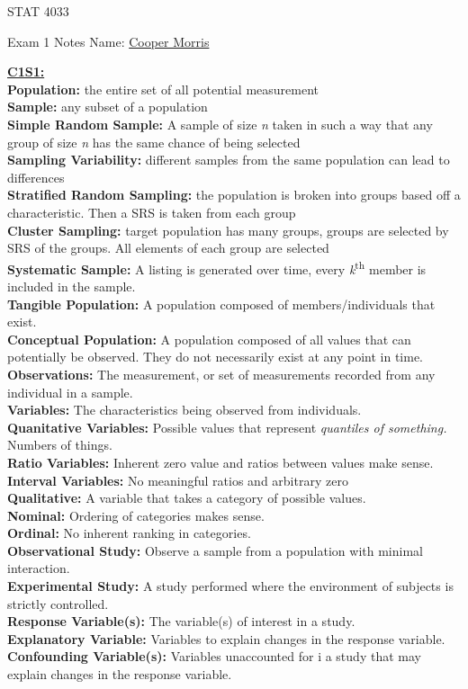 \documentclass[letter, 12pt]{article}
\begin{document}
\begin{center}
STAT 4033
\end{center}
Exam 1 Notes \hfill Name: \uline{Cooper Morris}
\begin{multicols}{2}
\textbf{\uline{C1S1:}}\\
\textbf{Population:} the entire set of all potential measurement\\
\textbf{Sample:} any subset of a population\\
\textbf{Simple Random Sample:} A sample of size \textit{n} taken in such a way that any group of size \textit{n} has the same chance of being selected\\
\textbf{Sampling Variability:} different samples from the same population can lead to differences\\
\textbf{Stratified Random Sampling:} the population is broken into groups based off a characteristic. Then a SRS is taken from each group\\
\textbf{Cluster Sampling:} target population has many groups, groups are selected by SRS of the groups. All elements of each group are selected\\
\textbf{Systematic Sample:} A listing is generated over time, every \textit{k}\textsuperscript{th} member is included in the sample.\\
\textbf{Tangible Population:} A population composed of members/individuals that exist.\\
\textbf{Conceptual Population:} A population composed of all values that can potentially be observed. They do not necessarily exist at any point in time.\\
\textbf{Observations:} The measurement, or set of measurements recorded from any individual in a sample.\\
\textbf{Variables:} The characteristics being observed from individuals.\\
\textbf{Quanitative Variables:} Possible values that represent \textit{quantiles of something.} Numbers of things.\\
\textbf{Ratio Variables:} Inherent zero value and ratios between values make sense.
\textbf{Interval Variables:} No meaningful ratios and arbitrary zero \\
\textbf{Qualitative:} A variable that takes a category of possible values.\\
\textbf{Nominal:} Ordering of categories makes sense.\\
\textbf{Ordinal:} No inherent ranking in categories.\\
\textbf{Observational Study:} Observe a sample from a population with minimal interaction.\\
\textbf{Experimental Study:} A study performed where the environment of subjects is strictly controlled.\\
\textbf{Response Variable(s):} The variable(s) of interest in a study.\\
\textbf{Explanatory Variable:} Variables to explain changes in the response variable.\\
\textbf{Confounding Variable(s):} Variables unaccounted for i a study that may explain changes in the response variable.

\vfill
\columnbreak
\vspace*{\fill}
\end{multicols}
\end{document}
